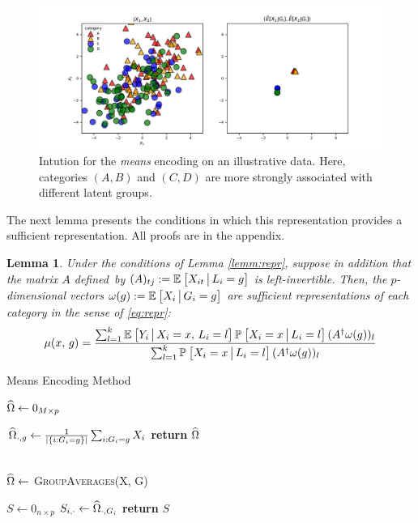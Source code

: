 \documentclass{article}
\theoremstyle{plain}
\newtheorem{lemm}[prop]{Lemma}
\theoremstyle{definition}
\theoremstyle{remark}
\begin{document}
\begin{figure}[H]
  \centering
  \includegraphics[width=\textwidth]{figures/means_intuition.pdf}
  \caption{Intution for the \emph{means} encoding on an illustrative data. Here, categories $(A,B)$ and $(C,D)$ are more strongly associated with different latent groups.}
  \label{fig:means_intuition}
\end{figure}


The next lemma presents the conditions in which this representation provides a sufficient representation. All proofs are in the appendix.

\begin{lemm}
\label{lemm:means}
Under the conditions of Lemma \ref{lemm:repr}, suppose in addition that the matrix $A$ defined~by $(A)_{tj} := \mathbb{E}_{}\left[X_{it} \,\big|\, L_{i} = g\right]$
is left-invertible. Then, the $p$-dimensional vectors $\omega(g) := \mathbb{E}_{}\left[X_{i} \,\big|\, G_i = g\right]$ are sufficient representations of each category in the sense of \eqref{eq:repr}:
\begin{equation}
\label{eq:explicit_mom}
\mu(x, \, g) = \frac{\sum_{l = 1}^k  \mathbb{E}_{}\left[Y_i \,\big|\, X_i = x, \, L_i = l\right] \mathbb{P}_{}\left[X_i = x \,\big|\, L_i = l\right] (A^\dagger \omega(g))_l}{\sum_{l = 1}^k \mathbb{P}_{}\left[X_i = x \,\big|\, L_i = l\right] (A^\dagger \omega(g))_l}
\end{equation}
\end{lemm}


\begin{algorithm}
\label{alg:means}
\caption{Means Encoding Method}
\begin{algorithmic}[1]

  \State $\widehat{\Omega} \gets 0_{M \times p}$

  \vspace{0.09cm}
  \State $\widehat{\Omega}_{\cdot,g} \gets \frac{1}{|\{i:G_{i}=g\}|}\sum_{i:G_{i}=g}X_{i}$
  \EndFor
  \State \textbf{return} $\widehat{\Omega}$
  \EndProcedure

  \\

  \State $\widehat{\Omega} \gets$ \textsc{GroupAverages}(X, G)

  \State $S \gets 0_{n \times p}$
  \State $S_{i,\cdot} \gets \widehat{\Omega}_{\cdot,G_{i}}$
  \EndFor
  \State \textbf{return} $S$
  \EndProcedure

\end{algorithmic}
\end{algorithm}
\end{document}
